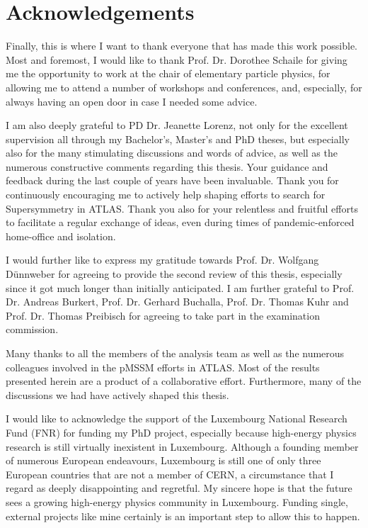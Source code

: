 
\chapter*{Acknowledgements} 
\thispagestyle{empty}


Finally, this is where I want to thank everyone that has made this work possible. Most and foremost, I would like to thank Prof.\@\xspace Dr.\@\xspace Dorothee Schaile for giving me the opportunity to work at the chair of elementary particle physics, for allowing me to attend a number of workshops and conferences, and, especially, for always having an open door in case I needed some advice.

I am also deeply grateful to PD\@\xspace Dr.\@\xspace Jeanette Lorenz, not only for the excellent supervision all through my Bachelor's, Master's and PhD theses, but especially also for the many stimulating discussions and words of advice, as well as the numerous constructive comments regarding this thesis. Your guidance and feedback during the last couple of years have been invaluable. Thank you for continuously encouraging me to actively help shaping efforts to search for Supersymmetry in ATLAS. Thank you also for your relentless and fruitful efforts to facilitate a regular exchange of ideas, even during times of pandemic-enforced home-office and isolation.

I would further like to express my gratitude towards Prof.\@\xspace Dr.\@\xspace Wolfgang D\"unnweber for agreeing to provide the second review of this thesis, especially since it got much longer than initially anticipated. I am further grateful to Prof.\@\xspace Dr.\@\xspace Andreas Burkert, Prof.\@\xspace Dr.\@\xspace Gerhard Buchalla, Prof.\@\xspace Dr.\@\xspace Thomas Kuhr and Prof.\@\xspace Dr.\@\xspace Thomas Preibisch for agreeing to take part in the examination commission.

Many thanks to all the members of the \onelepton analysis team as well as the numerous colleagues involved in the pMSSM efforts in ATLAS. Most of the results presented herein are a product of a collaborative effort. Furthermore, many of the discussions we had have actively shaped this thesis.

I would like to acknowledge the support of the Luxembourg National Research Fund (FNR) for funding my PhD project, especially because high-energy physics research is still virtually inexistent in Luxembourg. Although a founding member of numerous European endeavours, Luxembourg is still one of only three European countries that are not a member of CERN, a circumstance that I regard as deeply disappointing and regretful. My sincere hope is that the future sees a growing high-energy physics community in Luxembourg. Funding single, external projects like mine certainly is an important step to allow this to happen.

